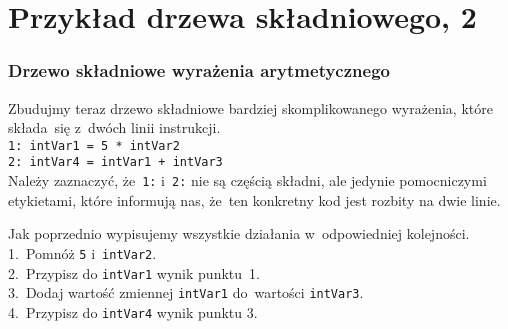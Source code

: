 \documentclass[10pt,t]{beamer}
\begin{document}
\section{Przykład drzewa składniowego, 2}

\label{sec:Podstawy-budowy-procesora-i-jezyka-asemblera}


\begin{frame}
  \frametitle{Drzewo składniowe wyrażenia arytmetycznego}


  Zbudujmy teraz drzewo składniowe bardziej skomplikowanego wyrażenia,
  które składa~się z~dwóch linii instrukcji. \\
  \texttt{1: intVar1 = 5 * intVar2} \\
  \texttt{2: intVar4 = intVar1 + intVar3} \\
  Należy zaznaczyć, że~\texttt{1:} i~\texttt{2:} nie są częścią składni,
  ale jedynie pomocniczymi etykietami, które informują nas, że~ten
  konkretny kod jest rozbity na dwie linie.

  Jak poprzednio wypisujemy wszystkie działania w~odpowiedniej
  kolejności. \\
  1.~Pomnóż \texttt{5} i~\texttt{intVar2}. \\
  2.~Przypisz do \texttt{intVar1} wynik punktu~1. \\
  3.~Dodaj wartość zmiennej \texttt{intVar1} do~wartości
  \texttt{intVar3}. \\
  4.~Przypisz do \texttt{intVar4} wynik punktu 3. \\

\end{frame}
\end{document}
